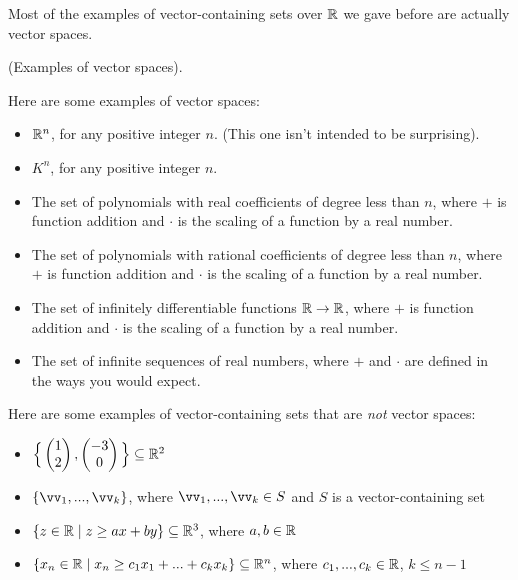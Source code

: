 Most of the examples of vector-containing sets over $\mathbb{R}$ we gave before are actually vector spaces.

\begin{remark}
    (Examples of vector spaces).
    
    Here are some examples of vector spaces:
    
    \begin{itemize}
        \item $\mathbb{R}^n$, for any positive integer $n$. (This one isn't intended to be surprising).
        \item $K^n$, for any positive integer $n$.
        \item The set of polynomials with real coefficients of degree less than $n$, where $+$ is function addition and $\cdot$ is the scaling of a function by a real number.
        \item The set of polynomials with rational coefficients of degree less than $n$, where $+$ is function addition and $\cdot$ is the scaling of a function by a real number.
        \item The set of infinitely differentiable functions $\mathbb{R} \rightarrow \mathbb{R}$, where $+$ is function addition and $\cdot$ is the scaling of a function by a real number.
        \item The set of infinite sequences of real numbers, where $+$ and $\cdot$ are defined in the ways you would expect.
    \end{itemize}
    
    Here are some examples of vector-containing sets that are \textit{not} vector spaces:
    
    \begin{itemize}
        \item $\Big\{ \begin{pmatrix} 1 \\ 2 \end{pmatrix}, \begin{pmatrix} -3 \\ 0 \end{pmatrix} \Big\} \subseteq \mathbb{R}^2$
        \item $\{\vv_1, ..., \vv_k\}$, where $\vv_1, ..., \vv_k \in S$ and $S$ is a vector-containing set
        \item $\{ z \in \mathbb{R} \mid z \geq ax + by \} \subseteq \mathbb{R}^3$, where $a, b \in \mathbb{R}$
        \item $\{ x_n \in \mathbb{R} \mid x_n \geq c_1 x_1 + ... + c_k x_k \} \subseteq \mathbb{R}^n$, where $c_1, ..., c_k \in \mathbb{R}$, $k \leq n - 1$
    \end{itemize}
\end{remark}

